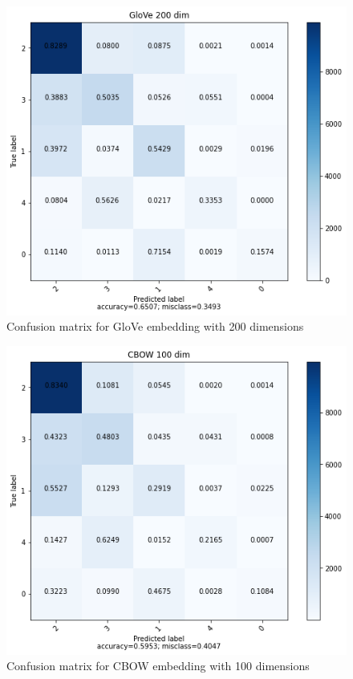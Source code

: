 \documentclass{article}
\begin{document}
\begin{figure}[ht]
    \centering
    \includegraphics[scale=0.4]{../code/images/GloVe200.png}
    \caption{Confusion matrix for GloVe embedding with 200 dimensions}
    \label{fig:g200}
\end{figure}
\begin{figure}[ht]
    \centering
    \includegraphics[scale=0.4]{../code/images/CBow100.png}
    \caption{Confusion matrix for CBOW embedding with 100 dimensions}
    \label{fig:c100}
\end{figure}
\end{document}
